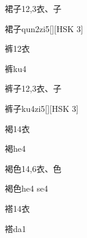 \begin{entry}{裙子}{12,3}{⾐、⼦}
  \begin{phonetics}{裙子}{qun2zi5}[][HSK 3]
  \end{phonetics}
\end{entry}

\begin{entry}{裤}{12}{⾐}
  \begin{phonetics}{裤}{ku4}
  \end{phonetics}
\end{entry}

\begin{entry}{裤子}{12,3}{⾐、⼦}
  \begin{phonetics}{裤子}{ku4zi5}[][HSK 3]
  \end{phonetics}
\end{entry}

\begin{entry}{褐}{14}{⾐}
  \begin{phonetics}{褐}{he4}
  \end{phonetics}
\end{entry}

\begin{entry}{褐色}{14,6}{⾐、⾊}
  \begin{phonetics}{褐色}{he4 se4}
  \end{phonetics}
\end{entry}

\begin{entry}{褡}{14}{⾐}
  \begin{phonetics}{褡}{da1}
  \end{phonetics}
\end{entry}


